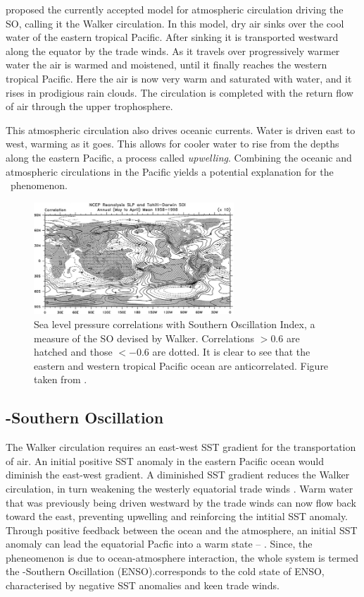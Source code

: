 \cite{bjerknes1969} proposed the currently accepted model for atmospheric
circulation driving the SO, calling it the Walker circulation. In this model,
dry air sinks over the cool water of the eastern tropical Pacific. After sinking
it is transported westward along the equator by the trade winds. As it travels
over progressively warmer water the air is warmed and moistened, until it
finally reaches the western tropical Pacific. Here the air is now very warm and
saturated with water, and it rises in prodigious rain clouds. The circulation is
completed with the return flow of air through the upper
trophosphere.

This atmospheric circulation also drives oceanic currents. Water is driven east
to west, warming as it goes. This allows for cooler water to rise from the
depths along the eastern Pacific, a process called \emph{upwelling}. Combining
the oceanic and atmospheric circulations in the Pacific yields a potential
explanation for the \elnino\ phenomenon.

\begin{figure}
  \centering
  \label{fig:slp_corr}
  \includegraphics[width=0.67\textwidth]{figures/slp_corr}
  \caption{Sea level pressure correlations with Southern Oscillation Index, a
    measure of the SO devised by Walker. Correlations $>0.6$ are hatched and
    those $<-0.6$ are dotted. It is clear to see that the eastern and western
    tropical Pacific ocean are anticorrelated. Figure taken from
    \cite{trenberth2000}.}
\end{figure}

\subsection{\elnino-Southern Oscillation}
The Walker circulation requires an east-west SST gradient for the transportation
of air. An initial positive SST anomaly in the eastern Pacific ocean would
diminish the east-west gradient. A diminished SST gradient reduces the Walker
circulation, in turn weakening the westerly equatorial trade winds
\citep{lindzen1987}. Warm water that was previously being driven westward by the
trade winds can now flow back toward the east, preventing upwelling and
reinforcing the intitial SST anomaly. Through positive feedback between the
ocean and the atmosphere, an initial SST anomaly can lead the equatorial Pacfic
into a warm state -- \elnino. Since, the pheneomenon is due to ocean-atmosphere
interaction, the whole system is termed the \elnino-Southern Oscillation
(ENSO).\nina corresponds to the cold state of ENSO, characterised by negative
SST anomalies and keen trade winds.

